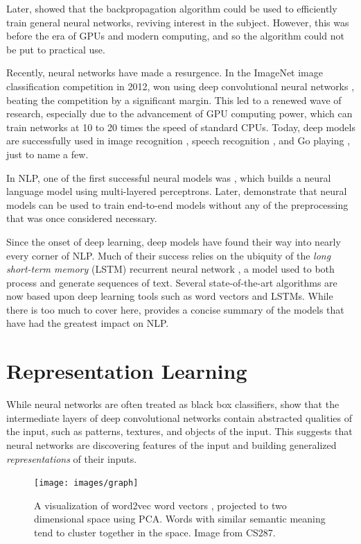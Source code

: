 \documentclass[12pt]{report}
\begin{document}
Later, \citet{Rumelhart1986} showed that the backpropagation algorithm could be used to efficiently train general neural networks, reviving interest in the subject. However, this was before the era of GPUs and modern computing, and so the algorithm could not be put to practical use.

Recently, neural networks have made a resurgence. In the ImageNet image classification competition in 2012, \citet{Krizhevsky2012} won using deep convolutional neural networks \citep{LeCun1995}, beating the competition by a significant margin. This led to a renewed wave of research, especially due to the advancement of GPU computing power, which can train networks at 10 to 20 times the speed of standard CPUs. Today, deep models are successfully used in image recognition \citep{Farabet2013}, speech recognition \citep{Hinton2012}, and Go playing \citep{Silver2016}, just to name a few.


In NLP, one of the first successful neural models was \citet{Bengio2003}, which builds a neural language model using multi-layered perceptrons. Later, \citet{Collobert2011} demonstrate that neural models can be used to train end-to-end models without any of the preprocessing that was once considered necessary.

Since the onset of deep learning, deep models have found their way into nearly every corner of NLP. Much of their success relies on the ubiquity of the \emph{long short-term memory} (LSTM) recurrent neural network \citep{hochreiter1997long}, a model used to both process and generate sequences of text.
Several state-of-the-art algorithms are now based upon deep learning tools such as word vectors and LSTMs. While there is too much to cover here, \citet{goldberg2015primer} provides a concise summary of the models that have had the greatest impact on NLP. %

\section{Representation Learning}

While neural networks are often treated as black box classifiers, \citet{Zeiler2014} show that the intermediate layers of deep convolutional networks contain abstracted qualities of the input, such as patterns, textures, and objects of the input. This suggests that neural networks are discovering features of the input and building generalized \emph{representations} of their inputs.

\begin{figure}
\centering
\texttt{[image: images/graph]}
\caption{A visualization of word2vec word vectors \citep{mikolov2013word2vec}, projected to two dimensional space using PCA. Words with similar semantic meaning tend to cluster together in the space. Image from CS287.}
\label{fig:word2vec}
\end{figure}
\end{document}
